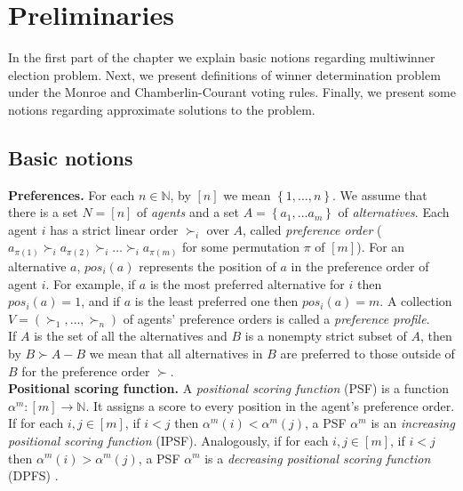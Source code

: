 \chapter{Preliminaries}
\label{cha:preliminaries}

In the first part of the chapter we explain basic notions regarding multiwinner election problem. Next, we present definitions of winner determination problem under the Monroe and Chamberlin-Courant voting rules. Finally, we present some notions regarding approximate solutions to the problem.

\section{Basic notions}

\noindent
\textbf{Preferences.} \hspace{.1in} For each $n \in \mathbb{N}$, by $[n]$ we mean $\left\{ 1, \ldots, n \right\}$. We assume that there is a set $N = [n]$ of \textit{agents} and a set $A = \left\{ a_{1}, \ldots a_{m} \right\}$ of \textit{alternatives}. Each agent $i$ has a strict linear order $\succ_{i}$ over $A$, called \textit{preference order} ($a_{\pi(1)} \succ_{i} a_{\pi(2)} \succ_{i} \ldots \succ_{i} a_{\pi(m)}$ for some permutation $\pi$ of $[m]$). For an alternative $a$, $pos_{i}(a)$ represents the position of $a$ in the preference order of agent $i$. For example, if $a$ is the most preferred alternative for $i$ then $pos_{i}(a) = 1$, and if $a$ is the least preferred one then $pos_{i}(a) = m$. A collection $V = (\succ_{1}, \ldots, \succ_{n})$ of agents' preference orders is called a \textit{preference profile}.
\\

If $A$ is the set of all the alternatives and $B$ is a nonempty strict subset of $A$, then by $B \succ A - B$ we mean that all alternatives in $B$ are preferred to those outside of $B$ for the preference order $\succ$.
\\

\noindent
\textbf{Positional scoring function.} \hspace{.1in} A \textit{positional scoring function} (PSF) is a function $\alpha^{m}: [m] \rightarrow \mathbb{N}$. It assigns a score to every position in the agent's preference order. If for each $i,j \in [m]$, if $i < j$ then $\alpha^{m}(i) < \alpha^{m}(j)$, a PSF $\alpha^{m}$ is an \textit{increasing positional scoring function} (IPSF). Analogously, if for each $i,j \in [m]$, if $i < j$ then $\alpha^{m}(i) > \alpha^{m}(j)$, a PSF $\alpha^{m}$ is a \textit{decreasing positional scoring function} (DPFS) .
\\

